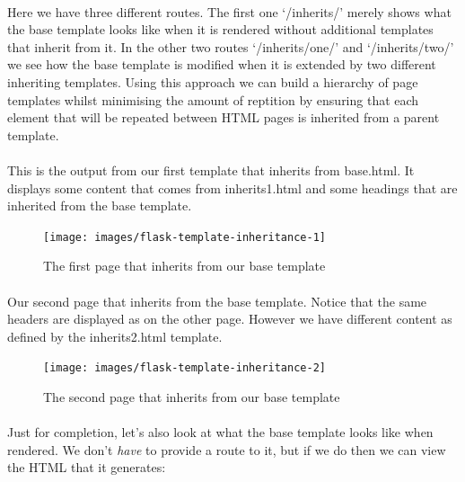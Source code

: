 \documentclass[12pt, a4paper, oneside]{book}
\begin{document}
\paragraph{} Here we have three different routes. The first one `/inherits/' merely shows what the base template looks like when it is rendered without additional templates that inherit from it. In the other two routes `/inherits/one/' and `/inherits/two/' we see how the base template is modified when it is extended by two different inheriting templates. Using this approach we can build a hierarchy of page templates whilst minimising the amount of reptition by ensuring that each element that will be repeated between HTML pages is inherited from a parent template.

\paragraph{} This is the output from our first template that inherits from base.html. It displays some content that comes from inherits1.html and some headings that are inherited from the base template.

\begin{figure}[H]
\centering
\texttt{[image: images/flask-template-inheritance-1]}
\caption{The first page that inherits from our base template}
\label{fig:flask-template-inheritance-1}
\end{figure}

\paragraph{} Our second page that inherits from the base template. Notice that the same headers are displayed as on the other page. However we have different content as defined by the inherits2.html template.

\begin{figure}[H]
\centering
\texttt{[image: images/flask-template-inheritance-2]}
\caption{The second page that inherits from our base template}
\label{fig:flask-template-inheritance-2}
\end{figure}

\paragraph{} Just for completion, let's also look at what the base template looks like when rendered. We don't \emph{have} to provide a route to it, but if we do then we can view the HTML that it generates:
\end{document}
